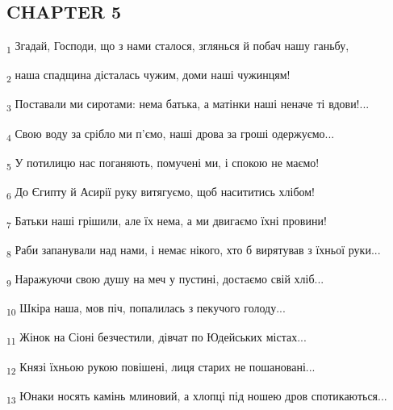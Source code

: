 \subsection{CHAPTER 5}
\begin{tcolorbox}
\textsubscript{1} Згадай, Господи, що з нами сталося, зглянься й побач нашу ганьбу,
\end{tcolorbox}
\begin{tcolorbox}
\textsubscript{2} наша спадщина дісталась чужим, доми наші чужинцям!
\end{tcolorbox}
\begin{tcolorbox}
\textsubscript{3} Поставали ми сиротами: нема батька, а матінки наші неначе ті вдови!...
\end{tcolorbox}
\begin{tcolorbox}
\textsubscript{4} Свою воду за срібло ми п'ємо, наші дрова за гроші одержуємо...
\end{tcolorbox}
\begin{tcolorbox}
\textsubscript{5} У потилицю нас поганяють, помучені ми, і спокою не маємо!
\end{tcolorbox}
\begin{tcolorbox}
\textsubscript{6} До Єгипту й Асирії руку витягуємо, щоб насититись хлібом!
\end{tcolorbox}
\begin{tcolorbox}
\textsubscript{7} Батьки наші грішили, але їх нема, а ми двигаємо їхні провини!
\end{tcolorbox}
\begin{tcolorbox}
\textsubscript{8} Раби запанували над нами, і немає нікого, хто б вирятував з їхньої руки...
\end{tcolorbox}
\begin{tcolorbox}
\textsubscript{9} Наражуючи свою душу на меч у пустині, достаємо свій хліб...
\end{tcolorbox}
\begin{tcolorbox}
\textsubscript{10} Шкіра наша, мов піч, попалилась з пекучого голоду...
\end{tcolorbox}
\begin{tcolorbox}
\textsubscript{11} Жінок на Сіоні безчестили, дівчат по Юдейських містах...
\end{tcolorbox}
\begin{tcolorbox}
\textsubscript{12} Князі їхньою рукою повішені, лиця старих не пошановані...
\end{tcolorbox}
\begin{tcolorbox}
\textsubscript{13} Юнаки носять камінь млиновий, а хлопці під ношею дров спотикаються...
\end{tcolorbox}
